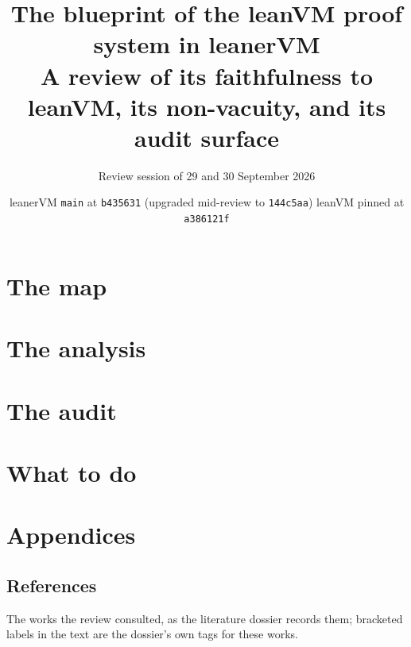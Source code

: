 \documentclass[10pt,a4paper]{report}
\title{\textsf{\bfseries The blueprint of the leanVM proof system in leanerVM}\\[4pt]
  \large\textsf{A review of its faithfulness to leanVM, its non-vacuity, and its audit surface}}
\author{\textsf{Review session of 29 and 30 September 2026}}
\date{\textsf{leanerVM \texttt{main} at \texttt{b435631} (upgraded mid-review to \texttt{144c5aa}) \quad leanVM pinned at \texttt{a386121f}}}
\begin{document}
\maketitle


\tableofcontents

\part{The map}





\part{The analysis}




\part{The audit}




\part{What to do}





\appendix
\part{Appendices}







\chapter*{References}
The works the review consulted, as the literature dossier records them; bracketed labels in the
text are the dossier's own tags for these works.
\nocite{*}

\renewcommand{\bibname}{}

\end{document}
